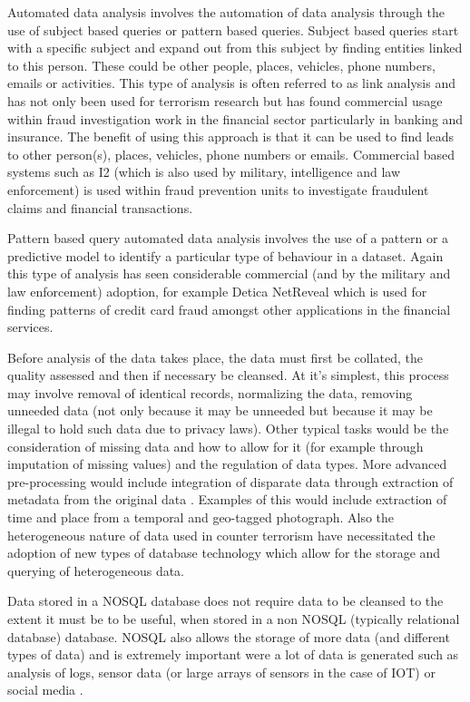 Automated data analysis involves the automation of data analysis through the use of subject based queries or pattern based queries. Subject based queries start with a specific subject and expand out from this subject by finding entities linked to this person. These could be other people, places, vehicles, phone numbers, emails or activities. This type of analysis is often referred to as link analysis \citep{berry1997data} and has not only been used for terrorism research but has found commercial usage within fraud investigation work in the financial sector particularly in banking and insurance. The benefit of using this approach is that it can be used to find leads to other person(s), places, vehicles, phone numbers or emails. Commercial based systems such as I2 \citep{i2Analyze2016} (which is also used by military, intelligence and law enforcement) is used within fraud prevention units to investigate fraudulent claims and financial transactions.

Pattern based query automated data analysis involves the use of a pattern or a predictive model to identify a particular type of behaviour in a dataset. Again this type of analysis has seen considerable commercial (and by the military and law enforcement) adoption, for example Detica NetReveal \citep{oatley2011data} which is used for finding patterns of credit card fraud amongst other applications in the financial services.  

Before analysis of the data takes place, the data must first be collated, the quality assessed and then if necessary be cleansed. At it's simplest, this process may involve removal of identical records, normalizing the data, removing unneeded data (not only because it may be unneeded but because it may be illegal to hold such data due to privacy laws). Other typical tasks would be the consideration of missing data and how to allow for it (for example through imputation of missing values) and the regulation of data types. More advanced pre-processing would include integration of disparate data through extraction of metadata from the original data \citep{derosa2004data}. Examples of this would include extraction of  time and place from a temporal and geo-tagged photograph. Also the heterogeneous nature of data used in counter terrorism have necessitated the adoption of new types of database technology which allow for the storage and querying of heterogeneous data.  

Data stored in a NOSQL database does not require data to be cleansed to the extent it must be to be useful, when stored in a non NOSQL (typically relational database) database. NOSQL also allows the storage of more data (and different types of data) and is extremely important were a lot of data is generated such as analysis of logs, sensor data (or large arrays of sensors in the case of IOT) or social media \citep{jeberson2015survey}.

